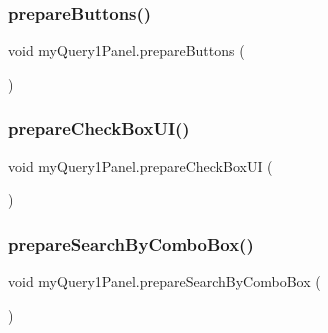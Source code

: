 \hypertarget{classmy_query1_panel_a0a640aa15c5356a9eab718201267a245}{}\label{classmy_query1_panel_a0a640aa15c5356a9eab718201267a245} 
\subsubsection{\texorpdfstring{prepare\+Buttons()}{prepareButtons()}}
{\footnotesize\ttfamily void my\+Query1\+Panel.\+prepare\+Buttons (\begin{DoxyParamCaption}{ }\end{DoxyParamCaption})}

\hypertarget{classmy_query1_panel_ad7b5f2e116e6e88a6d8c71f2c0633b42}{}\label{classmy_query1_panel_ad7b5f2e116e6e88a6d8c71f2c0633b42} 
\subsubsection{\texorpdfstring{prepare\+Check\+Box\+U\+I()}{prepareCheckBoxUI()}}
{\footnotesize\ttfamily void my\+Query1\+Panel.\+prepare\+Check\+Box\+UI (\begin{DoxyParamCaption}{ }\end{DoxyParamCaption})\hspace{0.3cm}{\ttfamily [private]}}

\hypertarget{classmy_query1_panel_ab15b9ca3d19fe07f6c660231ba97cd47}{}\label{classmy_query1_panel_ab15b9ca3d19fe07f6c660231ba97cd47} 
\subsubsection{\texorpdfstring{prepare\+Search\+By\+Combo\+Box()}{prepareSearchByComboBox()}}
{\footnotesize\ttfamily void my\+Query1\+Panel.\+prepare\+Search\+By\+Combo\+Box (\begin{DoxyParamCaption}{ }\end{DoxyParamCaption})\hspace{0.3cm}{\ttfamily [private]}}

